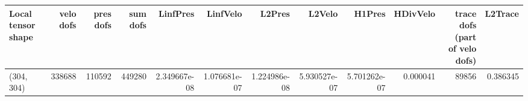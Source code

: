 \begin{tabular}{lrrrrrrrrrrr}
\toprule
Local tensor shape &  velo dofs &  pres dofs &  sum dofs &     LinfPres &     LinfVelo &       L2Pres &       L2Velo &       H1Pres &  HDivVelo &  trace dofs (part of velo dofs) &  L2Trace \\
\midrule
        (304, 304) &     338688 &     110592 &    449280 & 2.349667e-08 & 1.076681e-07 & 1.224986e-08 & 5.930527e-07 & 5.701262e-07 &  0.000041 &                           89856 & 0.386345 \\
\bottomrule
\end{tabular}
